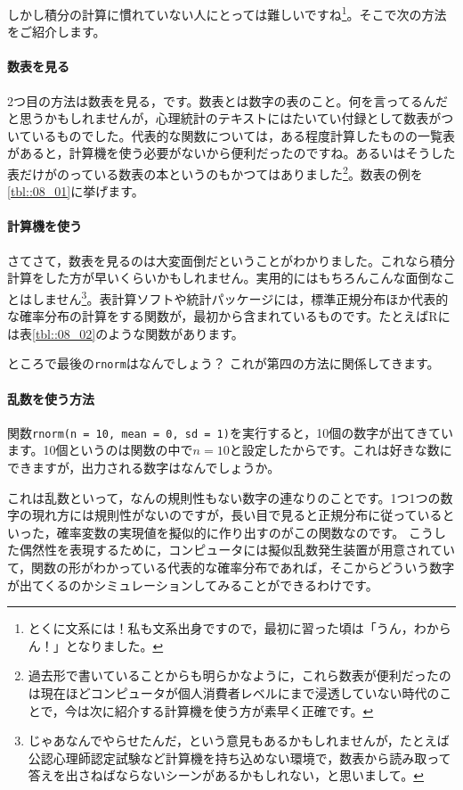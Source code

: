 しかし積分の計算に慣れていない人にとっては難しいですね\footnote{とくに文系には！私も文系出身ですので，最初に習った頃は「うん，わからん！」となりました。}。そこで次の方法をご紹介します。

\paragraph{数表を見る} 2つ目の方法は数表を見る，です。数表とは数字の表のこと。何を言ってるんだと思うかもしれませんが，心理統計のテキストにはたいてい付録として数表がついているものでした。代表的な関数については，ある程度計算したものの一覧表があると，計算機を使う必要がないから便利だったのですね。あるいはそうした表だけがのっている数表の本というのもかつてはありました\footnote{過去形で書いていることからも明らかなように，これら数表が便利だったのは現在ほどコンピュータが個人消費者レベルにまで浸透していない時代のことで，今は次に紹介する計算機を使う方が素早く正確です。}。数表の例を\ref{tbl::08_01}に挙げます。


\paragraph{計算機を使う} さてさて，数表を見るのは大変面倒だということがわかりました。これなら積分計算をした方が早いくらいかもしれません。実用的にはもちろんこんな面倒なことはしません\footnote{じゃあなんでやらせたんだ，という意見もあるかもしれませんが，たとえば公認心理師認定試験など計算機を持ち込めない環境で，数表から読み取って答えを出さねばならないシーンがあるかもしれない，と思いまして。}。表計算ソフトや統計パッケージには，標準正規分布ほか代表的な確率分布の計算をする関数が，最初から含まれているものです。たとえばRには表\ref{tbl::08_02}のような関数があります。


ところで最後の\texttt{rnorm}はなんでしょう？ これが第四の方法に関係してきます。

\paragraph{乱数を使う方法}
\label{randomVariablesMethod}
関数\texttt{rnorm(n = 10, mean = 0, sd = 1)}を実行すると，10個の数字が出てきています。10個というのは関数の中で$n=10$と設定したからです。これは好きな数にできますが，出力される数字はなんでしょうか。

これは乱数といって，なんの規則性もない数字の連なりのことです。1つ1つの数字の現れ方には規則性がないのですが，長い目で見ると正規分布に従っているといった，確率変数の実現値を擬似的に作り出すのがこの関数なのです。
こうした偶然性を表現するために，コンピュータには擬似乱数発生装置が用意されていて，関数の形がわかっている代表的な確率分布であれば，そこからどういう数字が出てくるのかシミュレーションしてみることができるわけです。

